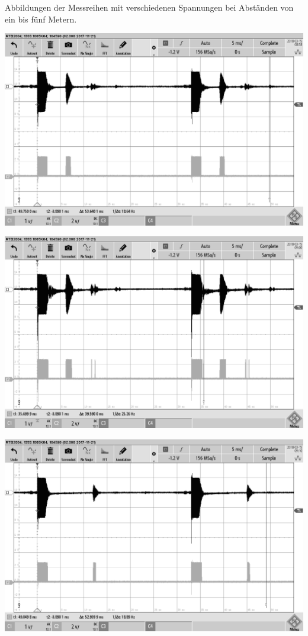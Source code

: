 Abbildungen der Messreihen mit verschiedenen Spannungen bei Abständen von ein bis fünf Metern.
\begin{minipage}{0.5\textwidth}
\includegraphics[width=1\textwidth%
]{Abbildungen/MessungenP2/5V/1m.PNG}
\end{minipage}
\begin{minipage}{0.5\textwidth}
\includegraphics[width=1\textwidth%
]{Abbildungen/MessungenP2/10V/1m.PNG}
\end{minipage}
\begin{minipage}{0.5\textwidth}
\includegraphics[width=1\textwidth%
]{Abbildungen/MessungenP2/5V/2m.PNG}
\end{minipage}
